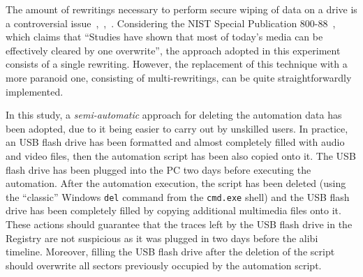 \documentclass[runningheads]{llncs}
\begin{document}
The amount of rewritings necessary to perform secure wiping of data on a drive is a controversial issue~\cite{usdod5220},~\cite{pgut01},~\cite{1ovew}.
Considering the NIST Special Publication 800-88~\cite{nist}, which claims that ``Studies have shown that most of today's media can be effectively cleared by one overwrite'', the approach adopted in this experiment consists of a single rewriting. However, the replacement of this technique with a more paranoid one, consisting of multi-rewritings, can be quite straightforwardly implemented.

In this study, a \emph{semi-automatic} approach for deleting the automation data has been adopted, due to it being easier to carry out by unskilled users.
In practice, an USB flash drive has been formatted and almost completely filled with audio and video files, then the automation script has been also copied onto it. The USB flash drive has been plugged into the PC two days before executing the automation. After the automation execution, the script has been deleted (using the ``classic'' Windows \verb=del= command from the \verb=cmd.exe= shell) and the USB flash drive has been completely filled by copying additional multimedia files onto it. These actions should guarantee that the traces left by the USB flash drive in the Registry are not suspicious as it was plugged in two days before the alibi timeline. Moreover, filling the USB flash drive after the deletion of the script should overwrite all sectors previously occupied by the automation script.
\end{document}
